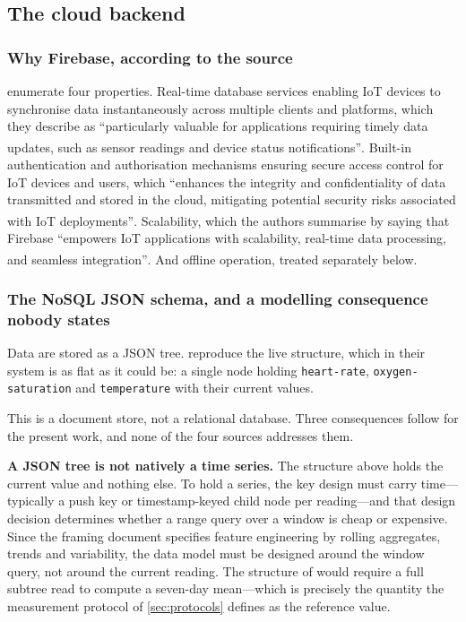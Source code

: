 \documentclass[12pt,a4paper,oneside]{report}
\newcommand{\bq}[1]{``#1''\textsuperscript{\dag}}
\begin{document}
\subsection{The cloud backend}\label{sec:backend}

\subsubsection{Why Firebase, according to the source}

\Textcite{efendi2025} enumerate four properties. Real-time database services enabling IoT devices to synchronise data instantaneously across multiple clients and platforms, which they describe as \bq{particularly valuable for applications requiring timely data updates, such as sensor readings and device status notifications}. Built-in authentication and authorisation mechanisms ensuring secure access control for IoT devices and users, which \bq{enhances the integrity and confidentiality of data transmitted and stored in the cloud, mitigating potential security risks associated with IoT deployments}. Scalability, which the authors summarise by saying that Firebase \bq{empowers IoT applications with scalability, real-time data processing, and seamless integration}. And offline operation, treated separately below.

\subsubsection{The NoSQL JSON schema, and a modelling consequence nobody states}\label{sec:schema}

Data are stored as a JSON tree. \Textcite{efendi2025} reproduce the live structure, which in their system is as flat as it could be: a single node holding \texttt{heart-rate}, \texttt{oxygen-saturation} and \texttt{temperature} with their current values.

This is a document store, not a relational database. Three consequences follow for the present work, and none of the four sources addresses them.

\textbf{A JSON tree is not natively a time series.} The structure above holds the current value and nothing else. To hold a series, the key design must carry time---typically a push key or timestamp-keyed child node per reading---and that design decision determines whether a range query over a window is cheap or expensive. Since the framing document specifies feature engineering by rolling aggregates, trends and variability, the data model must be designed around the window query, not around the current reading. The structure of \textcite{efendi2025} would require a full subtree read to compute a seven-day mean---which is precisely the quantity the measurement protocol of \cref{sec:protocols} defines as the reference value.
\end{document}
